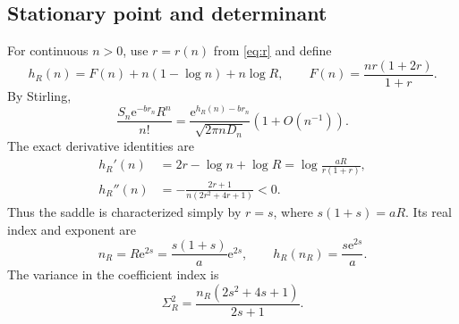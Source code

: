 \documentclass[11pt,a4paper]{article}
\numberwithin{equation}{section}
\theoremstyle{definition}
\theoremstyle{remark}\newtheorem{remark}[theorem]{Remark}
\newcommand{\ee}{\mathrm e}\newcommand{\dd}{\mathrm d}
\begin{document}
\subsection{Stationary point and determinant}
For continuous $n>0$, use $r=r(n)$ from \eqref{eq:r} and define
\begin{equation}
 h_R(n)=F(n)+n(1-\log n)+n\log R,
 \qquad F(n)=\frac{nr(1+2r)}{1+r}.
 \label{eq:hR}
\end{equation}
By Stirling,
\begin{equation}
 \frac{S_n\ee^{-br_n}R^n}{n!}
 =\frac{\ee^{h_R(n)-br_n}}{\sqrt{2\pi nD_n}}
 \left(1+O(n^{-1})\right).
 \label{eq:Bterm}
\end{equation}
The exact derivative identities are
\begin{align}
 h_R'(n)&=2r-\log n+\log R
 =\log\frac{aR}{r(1+r)},\label{eq:hprime}\\
 h_R''(n)&=-\frac{2r+1}{n(2r^2+4r+1)}<0.\label{eq:hsecond}
\end{align}
Thus the saddle is characterized simply by $r=s$, where $s(1+s)=aR$.
Its real index and exponent are
\begin{equation}
 n_R=R\ee^{2s}=\frac{s(1+s)}a\ee^{2s},\qquad
 h_R(n_R)=\frac{s\ee^{2s}}a.
 \label{eq:Bstationary}
\end{equation}
The variance in the coefficient index is
\begin{equation}
 \Sigma_R^2=\frac{n_R(2s^2+4s+1)}{2s+1}.
 \label{eq:Bvariance}
\end{equation}
\end{document}
